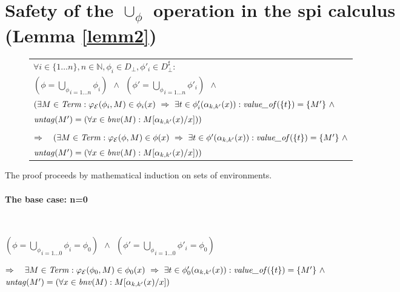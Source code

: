 \documentclass[10pt,a4paper,final,oneside,fleqn]{book}
\begin{document}
\section{Safety of the $\cup_\phi$ operation in the spi calculus\\(Lemma \ref{lemm2})\label{applemm2}}
\begin{figure*}[bht]
\begin{center}
\begin{tabular}{|l|}\hline
$\forall i\in \{1\ldots n\},n\in\mathbb{N},\phi_i\in D_\bot,\phi'_i\in D^\sharp_\bot:$\\
$(\phi=\underset{i=1\ldots n}{\bigcup_\phi}\phi_i)~~\wedge~~(\phi'=\underset{i=1\ldots n}{\bigcup_\phi}\phi'_i)~~\wedge$\\
$(\exists M\in\mbox{{\itshape Term\/}}:\varphi_\mathcal{E}(\phi_i,M)\in\phi_i(x)~\Rightarrow~\exists t\in\phi'_i(\alpha_{k,k'}(x)):\mbox{{\itshape value\_of\/}}(\{t\})=\{M'\}~\wedge$\\
$\mbox{{\itshape untag\/}}(M')=(\forall x\in\mbox{{\itshape bnv\/}}(M):M[\alpha_{k,k'}(x)/x]))$\\\\

\noindent
$\Rightarrow~~~(\exists M\in\mbox{{\itshape Term\/}}:\varphi_\mathcal{E}(\phi,M)\in\phi(x)~\Rightarrow~\exists t\in\phi'(\alpha_{k,k'}(x)): \mbox{{\itshape value\_of\/}}(\{t\})=\{M'\}~\wedge$\\
$\mbox{{\itshape untag\/}}(M')=(\forall x\in\mbox{{\itshape bnv\/}}(M):M[\alpha_{k,k'}(x)/x]))$
\\\hline\end{tabular}\end{center}\end{figure*}

\noindent
The proof proceeds by mathematical induction on sets of environments.
\paragraph{The base case: n=0}
$ $

\noindent
$(\phi=\underset{i=1\ldots 0}{\bigcup_\phi}\phi_i=\phi_{0})~~\wedge~~(\phi'=\underset{i=1\ldots 0}{\bigcup_\phi}\phi'_i=\phi_{0})$\vspace{5mm}

\noindent
$\Rightarrow~~~\exists M\in\mbox{{\itshape Term\/}}:\varphi_\mathcal{E}(\phi_0,M)\in\phi_0(x)~\Rightarrow~\exists t\in\phi'_0(\alpha_{k,k'}(x)):\mbox{{\itshape value\_of\/}}(\{t\})=\{M'\}~\wedge$\\
$\mbox{{\itshape untag\/}}(M')=(\forall x\in\mbox{{\itshape bnv\/}}(M):M[\alpha_{k,k'}(x)/x])$\vspace{5mm}
\end{document}
